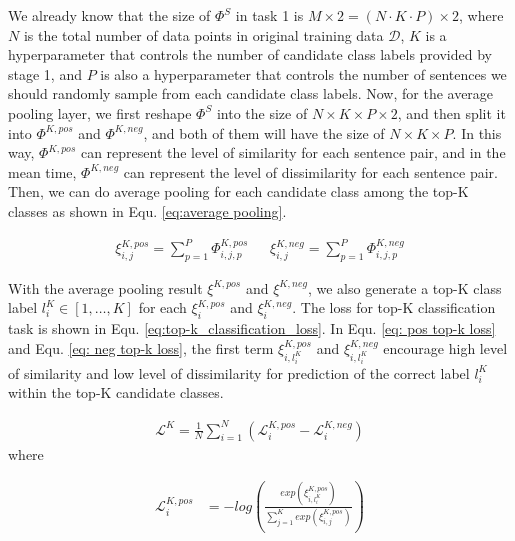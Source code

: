 We  already  know  that the size of ${\Phi}^S$ in task 1 is $M\times 2=(N\cdot
K\cdot  P)\times  2$, where $N$ is the total number of data points in original
training  data $\mathcal{D}$, $K$ is a hyperparameter that controls the number
of   candidate   class  labels  provided  by  stage  1,  and  $P$  is  also  a
hyperparameter that controls the number of sentences we should randomly sample
from each candidate class labels. Now, for the average pooling layer, we first
reshape  ${\Phi}^S$  into  the  size  of $N\times K\times P\times 2$, and then
split  it  into  ${\Phi}^{K,pos}$  and ${\Phi}^{K,neg}$, and both of them will
have  the  size  of  $N\times  K\times  P$.  In this way, ${\Phi}^{K,pos}$ can
represent  the  level  of  similarity  for each sentence pair, and in the mean
time,  ${\Phi}^{K,neg}$  can  represent  the  level  of dissimilarity for each
sentence  pair. Then, we can do average pooling for each candidate class among
the  top-K  classes  as  shown  in  Equ.  \ref{eq:average  pooling}.

\begin{align}
  {\xi}_{i,j}^{K,pos} = \sum_{p=1}^{P}{\varPhi}_{i,j,p}^{K,pos} \ \ \ \ \ \ \ 
  {\xi}_{i,j}^{K,neg} = \sum_{p=1}^{P}{\varPhi}_{i,j,p}^{K,neg}
  \label{eq:average pooling}
\end{align}

With  the  average pooling result ${\xi}^{K,pos}$ and ${\xi}^{K,neg}$, we also
generate   a   top-K   class   label   $l^{K}_i\in   [1,\dots,K]$   for   each
${\xi}^{K,pos}_{i}$ and ${\xi}^{K,neg}_{i}$. The loss for top-K classification
task is shown in Equ. \ref{eq:top-k_classification_loss}. In Equ. \ref{eq: pos
top-k   loss}   and   Equ.   \ref{eq:   neg   top-k   loss},  the  first  term
$\xi_{i,l^{K}_{i}}^{K,pos}$  and  $\xi_{i,l^{K}_{i}}^{K,neg}$  encourage  high
level  of  similarity  and  low  level  of dissimilarity for prediction of the
correct label $l^{K}_i$ within the top-K candidate classes.

\begin{align}
  \mathcal{L}^{K} = \frac{1}{N}\sum_{i=1}^{N}(\mathcal{L}^{K,pos}_{i} - \mathcal{L}^{K,neg}_{i})
  \label{eq:top-k_classification_loss}
\end{align}
where

\begin{equation}
  \begin{aligned}
    \mathcal{L}^{K,pos}_{i} &= -log(\frac{exp(\xi_{i,l^{K}_{i}}^{K,pos})}{\sum_{j=1}^{K}exp(\xi_{i,j}^{K,pos})})
    \label{eq: pos top-k loss}
  \end{aligned}
\end{equation}

